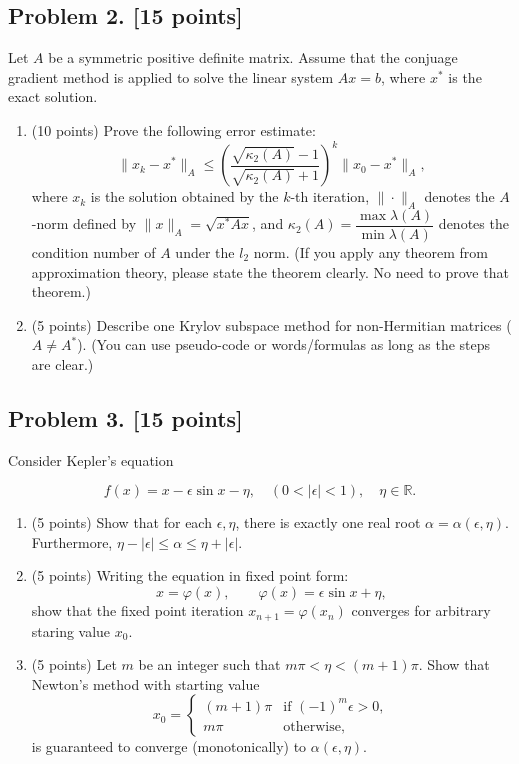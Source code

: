 \documentclass[11pt,a4paper]{article}
\begin{document}
\subsection{Problem 2. [15 points]}
Let \(A\) be a symmetric positive definite matrix. Assume that the conjuage gradient method is applied to solve the linear system \(Ax = b\), where \(x^{*}\) is the exact solution.
\begin{enumerate}[label=(\roman*)]
    \item (10 points) Prove the following error estimate:
    \[
    \|x_{k} - x^{*}\|_{A} \le \left( \frac{\sqrt{\kappa_{2}(A)} - 1}{\sqrt{\kappa_{2}(A)} + 1} \right)^{k} \|x_{0} - x^{*}\|_{A},
    \]
    where \(x_{k}\) is the solution obtained by the \(k\)-th iteration, \(\|\cdot\|_{A}\) denotes the \(A\)-norm defined by \(\|x\|_{A} = \sqrt{x^{*} A x}\), and \(\kappa_{2}(A) = \dfrac{\max \lambda(A)}{\min \lambda(A)}\) denotes the condition number of \(A\) under the \(l_{2}\) norm. (If you apply any theorem from approximation theory, please state the theorem clearly. No need to prove that theorem.)
    \item (5 points) Describe one Krylov subspace method for non-Hermitian matrices (\(A \neq A^{*}\)). (You can use pseudo-code or words/formulas as long as the steps are clear.)
\end{enumerate}

\subsection{Problem 3. [15 points]}
Consider Kepler's equation

\[
f(x) = x - \epsilon \sin x - \eta, \quad (0 < |\epsilon| < 1),\quad \eta \in \mathbb{R}.
\]

\begin{enumerate}[label=(\roman*)]
    \item (5 points) Show that for each \(\epsilon, \eta\), there is exactly one real root \(\alpha = \alpha(\epsilon, \eta)\). Furthermore, \(\eta - |\epsilon| \le \alpha \le \eta + |\epsilon|\).
    \item (5 points) Writing the equation in fixed point form:
    \[
    x = \varphi(x), \qquad \varphi(x) = \epsilon \sin x + \eta,
    \]
    show that the fixed point iteration \(x_{n+1} = \varphi(x_{n})\) converges for arbitrary staring value \(x_{0}\).
    \item (5 points) Let \(m\) be an integer such that \(m\pi < \eta < (m+1)\pi\). Show that Newton's method with starting value
    \[
    x_{0} =
    \begin{cases}
    (m+1)\pi & \text{if } (-1)^{m} \epsilon > 0, \\
    m\pi & \text{otherwise,}
    \end{cases}
    \]
    is guaranteed to converge (monotonically) to \(\alpha(\epsilon, \eta)\).
\end{enumerate}
\end{document}
